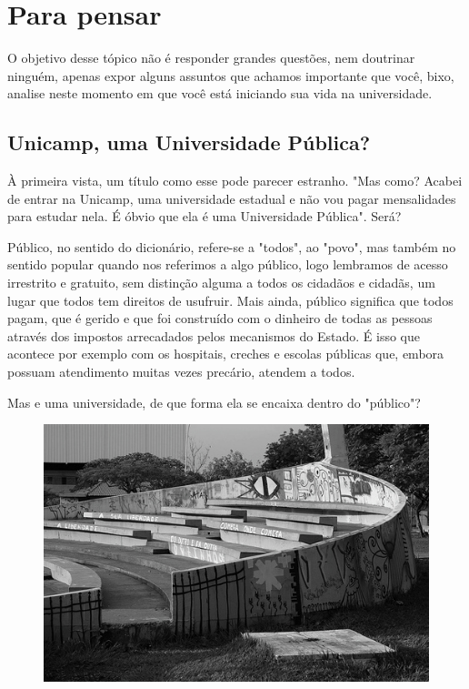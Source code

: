 
\section{Para pensar}

O objetivo desse tópico não é responder grandes questões, nem doutrinar ninguém,
apenas expor alguns assuntos que achamos importante que você, bixo, analise
neste momento em que você está iniciando sua vida na universidade.

\subsection{Unicamp, uma Universidade Pública?}

À primeira vista, um título como esse pode parecer estranho. "Mas como? Acabei
de entrar na Unicamp, uma universidade estadual e não vou pagar mensalidades
para estudar nela. É óbvio que ela é uma Universidade Pública". Será?

Público, no sentido do dicionário, refere-se a "todos", ao "povo", mas também no
sentido popular quando nos referimos a algo público, logo lembramos de acesso
irrestrito e gratuito, sem distinção alguma a todos os cidadãos e cidadãs, um
lugar que todos tem direitos de usufruir. Mais ainda, público significa que
todos pagam, que é gerido e que foi construído com o dinheiro de todas as
pessoas através dos impostos arrecadados pelos mecanismos do Estado. É isso que
acontece por exemplo com os hospitais, creches e escolas públicas que, embora
possuam atendimento muitas vezes precário, atendem a todos.

Mas e uma universidade, de que forma ela se encaixa dentro do "público"?
\begin{figure}[h!]
    \centering
    \includegraphics[scale=0.55,keepaspectratio=true]{img/imgs/4-para_pensar/-028.jpg}
\end{figure}

